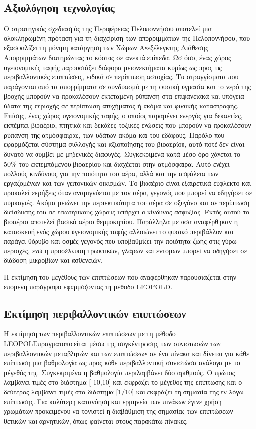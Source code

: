 \documentclass[12pt]{article}
\newcommand{\gr}{\selectlanguage{greek}}
\newcommand{\eng}{\selectlanguage{english}}
\begin{document}
	\subsection{Αξιολόγηση τεχνολογίας}
	
	Ο στρατηγικός σχεδιασμός της Περιφέρειας Πελοποννήσου αποτελεί μια ολοκληρωμένη πρόταση για τη διαχείριση των απορριμμάτων της Πελοποννήσου, που εξασφαλίζει τη μόνιμη κατάργηση των Χώρων Ανεξέλεγκτης Διάθεσης Απορριμμάτων διατηρώντας το κόστος σε ανεκτά επίπεδα. Ωστόσο, ένας χώρος υγειονομικής ταφής παρουσιάζει διάφορα μειονεκτήματα κυρίως ως προς τις περιβαλλοντικές επιπτώσεις, ειδικά σε περίπτωση αστοχίας. Τα στραγγίσματα που παράγονται από τα απορρίμματα σε συνδυασμό με τη φυσική υγρασία και το νερό της βροχής μπορούν να προκαλέσουν εκτεταμένη ρύπανση στα επιφανειακά και υπόγεια ύδατα της περιοχής σε περίπτωση ατυχήματος ή ακόμα και φυσικής καταστροφής. Επίσης, ένας χώρος υγειονομικής ταφής, ο οποίος παραμένει ενεργός για δεκαετίες, εκπέμπει βιοαέριο, πτητικά και δεκάδες τοξικές ενώσεις που μπορούν να προκαλέσουν ρύπανση της ατμόσφαιρας, των υδάτων ακόμα και του εδάφους. Παρόλο που εφαρμόζεται σύστημα συλλογής και αξιοποίησης του βιοαερίου, αυτό ποτέ δεν είναι δυνατό να συμβεί με μηδενικές διαφυγές. Συγκεκριμένα κατά μέσο όρο χάνεται το 50\% του εκπεμπόμενου βιοαερίου και διαχέεται στην ατμόσφαιρα. Αυτό ενέχει πολλούς κινδύνους για την ποιότητα του αέρα, αλλά και την ασφάλεια των εργαζομένων και των γειτονικών οικισμών. Το βιοαέριο είναι εξαιρετικά εύφλεκτο και προκαλεί εκρήξεις όταν αναμιγνύεται με τον αέρα, γεγονός που μπορεί να οδηγήσει σε πυρκαγιές. Ακόμα μειώνει την περιεκτικότητα του αέρα σε οξυγόνο και σε περίπτωση διείσδυσής του σε εσωτερικούς χώρους υπάρχει ο κίνδυνος ασφυξίας. Εκτός αυτού το βιοαέριο αποτελεί βασικό αέριο θερμοκηπίου. Παράλληλα με όσα αναφέρθηκαν η κατασκευή ενός χώρου υγειονομικής ταφής αλλοιώνει το φυσικό περιβάλλον και παράγει θόρυβο και οσμές γεγονός που υποβαθμίζει την ποιότητα ζωής στις γύρω περιοχές, ενώ η προσέλκυση τρωκτικών, γλάρων και εντόμων μπορεί να οδηγήσει σε διάδοση μικροβίων και ασθενειών. 
	
	Η εκτίμηση του μεγέθους των επιπτώσεων που αναφέρθηκαν παρουσιάζεται στην επόμενη παράγραφο εφαρμόζοντας τη μέθοδο \eng LEOPOLD.\gr
	
	\subsection{Εκτίμηση περιβαλλοντικών επιπτώσεων}
	
	Η εκτίμηση των περιβαλλοντικών επιπτώσεων με τη μέθοδο \eng LEOPOLD\gr  πραγματοποιείται μέσω της συγκέντρωσης των συνιστωσών των περιβαλλοντικών μεταβλητών και των επιπτώσεων σε ένα πίνακα και δίνεται για κάθε επίπτωση μια βαθμολογία ως προς κάθε περιβαλλοντική συνιστώσα ανάλογα με το μέγεθός της. Συγκεκριμένα η βαθμολογία περιλαμβάνει δύο αριθμούς. Ο πρώτος λαμβάνει τιμές στο διάστημα [-10,10] και εκφράζει το μέγεθος της επίπτωσης και ο δεύτερος λαμβάνει τιμές στο διάστημα [1/10] και εκφράζει τη σημασία της εν λόγω επίπτωσης. Για καλύτερη κατανόηση και ερμηνεία των πινάκων έγινε χρήση χρωμάτων προκειμένου να τονιστεί η διαβάθμιση της σημασίας των επιπτώσεων θετικών και αρνητικών, όπως φαίνεται στους παρακάτω πίνακες. 
	
\end{document}
